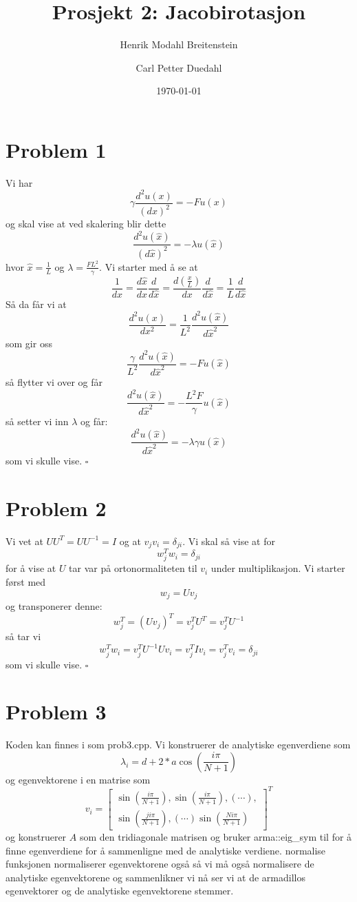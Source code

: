 \documentclass[reprint,english,notitlepage]{revtex4-1}  %
\begin{document}
\title{Prosjekt 2: Jacobirotasjon}   %
\author{Henrik Modahl Breitenstein}
\author{Carl Petter Duedahl}               %
\date{\today}                             %
\noaffiliation                            %
\maketitle                                %


\section*{Problem 1}
Vi har
$$
\gamma \frac{d^2u(x)}{(dx)^2}=-Fu(x)
$$
og skal vise at ved skalering blir dette
$$
\frac{d^2u(\hat{x})}{(d\hat{x})^2}=-\lambda u(\hat{x})
$$
hvor $\hat{x}=\frac{1}{L}$ og $\lambda=\frac{FL^2}{\gamma}$.
\newline Vi starter med å se at
$$
\frac{1}{dx}=\frac{d\hat{x}}{dx}\frac{d}{d\hat{x}}=\frac{d(\frac{x}{L})}{dx}\frac{d}{d\hat{x}}=\frac{1}{L}\frac{d}{d\hat{x}}
$$
Så da får vi at
$$
\frac{d^2u(x)}{dx^2}=\frac{1}{L^2}\frac{d^2u(\hat{x})}{d\hat{x}^2}
$$
som gir oss 
$$
\frac{\gamma}{L^2}\frac{d^2u(\hat{x})}{d\hat{x}^2}=-Fu(\hat{x})
$$
så flytter vi over og får
$$
\frac{d^2u(\hat{x})}{d\hat{x}^2}=-\frac{L^2  F}{\gamma}u(\hat{x})
$$
så setter vi inn $\lambda$ og får:
$$
\frac{d^2u(\hat{x})}{d\hat{x}^2}=-\lambda{\gamma}u(\hat{x})
$$
som vi skulle vise. $\square$
\section*{Problem 2}
Vi vet at $UU^T=UU^{-1}=I$ og at $v_jv_i=\delta_{ji}$. Vi skal så vise at for 
$$
w_j^Tw_i=\delta_{ji}
$$
for å vise at $U$ tar var på ortonormaliteten til $v_i$ under multiplikasjon.
\newline Vi starter først med
$$
w_j=Uv_j
$$
og transponerer denne:
$$
w_j^T=(Uv_j)^T=v_j^TU^T=v_j^TU^{-1}
$$
så tar vi
$$
w_j^Tw_i=v_j^TU^{-1}Uv_i=v_j^TIv_i=v_j^Tv_i=\delta_{ji}
$$
som vi skulle vise. $\square$
\section*{Problem 3}
Koden kan finnes i som prob3.cpp.
\newline Vi konstruerer de analytiske egenverdiene som
$$
\lambda_i=d+2*a\cos(\frac{i\pi}{N+1})
$$
og egenvektorene i en matrise som
$$
v_i=\begin{bmatrix}\sin(\frac{i\pi}{N+1}), \sin(\frac{i\pi}{N+1}), (\cdots), \\
\sin(\frac{ji\pi}{N+1}), (\cdots) \sin(\frac{Ni\pi}{N+1})
\end{bmatrix}^T
$$
og konstruerer $A$ som den tridiagonale matrisen og bruker arma::eig\_sym til for å finne egenverdiene for å sammenligne med de analytiske verdiene. normalise funksjonen normaliserer egenvektorene også så vi må også normalisere de analytiske egenvektorene og sammenlikner vi nå ser vi at de armadillos egenvektorer og de analytiske egenvektorene stemmer.
\end{document}
